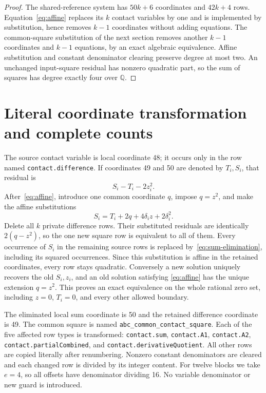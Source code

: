 \documentclass[11pt]{article}
\newcommand{\Q}{\mathbb Q}\newcommand{\Z}{\mathbb Z}
\begin{document}
\begin{proof}
The shared-reference system has \(50k+6\) coordinates and
\(42k+4\) rows. Equation~\eqref{eq:affine} replaces its \(k\) contact
variables by one and is implemented by substitution, hence removes
\(k-1\) coordinates without adding equations. The common-square
substitution of the next section removes another \(k-1\) coordinates
and \(k-1\) equations, by an exact algebraic equivalence.
Affine substitution and constant denominator clearing preserve degree
at most two. An
unchanged input-square residual has nonzero quadratic part, so the
sum of squares has degree exactly four over \(\Q\).
\end{proof}

\section{Literal coordinate transformation and complete counts}

The source contact variable is local coordinate 48; it occurs only in
the row named \texttt{contact.difference}. If coordinates 49 and 50
are denoted by \(T_i,S_i\), that residual is
\[
                         S_i-T_i-2z_i^2.
\]
After~\eqref{eq:affine}, introduce one common coordinate \(q\), impose
\(q=z^2\), and make the affine substitutions
\begin{equation}\label{eq:sum-elimination}
               S_i=T_i+2q+4\delta_i z+2\delta_i^2.
\end{equation}
Delete all \(k\) private difference rows. Their substituted residuals
are identically \(2(q-z^2)\), so the one new square row is equivalent
to all of them. Every occurrence of \(S_i\) in the remaining source
rows is replaced by~\eqref{eq:sum-elimination}, including its squared
occurrences. Since this substitution is affine in the retained
coordinates, every row stays quadratic. Conversely a new solution
uniquely recovers the old \(S_i,z_i\), and an old solution satisfying
\eqref{eq:affine} has the unique extension \(q=z^2\).
This proves an exact equivalence on the whole rational zero set,
including \(z=0\), \(T_i=0\), and every other allowed boundary.

The eliminated local sum coordinate is 50 and the retained difference
coordinate is 49. The common square is named
\texttt{abc\_common\_contact\_square}. Each of the five affected row
types is transformed: \texttt{contact.sum}, \texttt{contact.A1},
\texttt{contact.A2}, \texttt{contact.partialCombined}, and
\texttt{contact.derivativeQuotient}. All other rows are copied
literally after renumbering. Nonzero constant denominators are cleared
and each changed row is divided by its integer content. For twelve
blocks we take \(e=4\), so all offsets have denominator dividing 16.
No variable
denominator or new guard is introduced.
\end{document}
